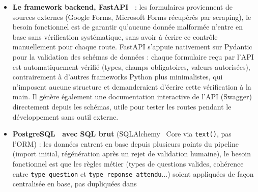 \documentclass[12pt,a4paper]{report}
\begin{document}
\begin{itemize}
    et bien cadrés. Son support multilingue prêt à l'emploi (français et anglais, les deux
    langues des formulaires traités) a aussi pesé dans ce choix. Un premier essai en
    conditions réelles a montré
    qu'une image brute donne souvent un score de confiance insuffisant (image inclinée,
    contraste faible, texte petit) : un pipeline de prétraitement a donc été construit
    (redressement automatique par détection d'angle, égalisation de contraste CLAHE,
    isolement du texte clair/sombre selon le fond, agrandissement x4 pour le texte fin),
    dont les variantes les plus coûteuses (agrandissement, tests multiples) ne sont
    calculées que si une première passe rapide n'atteint pas un score de confiance
    suffisant, ce qui évite de payer ce coût de calcul sur les images déjà bien reconnues dès le
    premier essai. Le score de confiance final conditionne aussi le
    \texttt{statut\_extraction} de la question (\texttt{ocr\_incertain} en dessous d'un
    seuil), pour qu'une extraction douteuse soit signalée à la validation humaine plutôt
    que silencieusement acceptée.
    \item \textbf{Le framework backend, FastAPI~\cite{fastapi}} : les formulaires
    proviennent de sources externes (Google Forms, Microsoft Forms
    récupérés par scraping), le besoin fonctionnel est de garantir
    qu'aucune donnée malformée n'entre en base sans vérification
    systématique, sans avoir à écrire ce contrôle manuellement pour
    chaque route. FastAPI s'appuie nativement sur Pydantic~\cite{pydantic} pour la
    validation des schémas de données : chaque formulaire reçu par l'API
    est automatiquement vérifié (types, champs obligatoires, valeurs
    autorisées), contrairement à d'autres frameworks Python plus
    minimalistes, qui n'imposent aucune structure et demanderaient
    d'écrire cette vérification à la main. Il génère également une
    documentation interactive de l'API (Swagger) directement depuis les
    schémas, utile pour tester les routes pendant le développement sans
    outil externe.
    \item \textbf{PostgreSQL~\cite{postgresql} avec SQL brut} (SQLAlchemy~\cite{sqlalchemy} Core via
    \texttt{text()}, pas l'ORM) : les données entrent en base depuis
    plusieurs points du pipeline (import initial, régénération après un
    rejet de validation humaine), le besoin fonctionnel est que les
    règles métier (types de questions valides, cohérence entre
    \texttt{type\_question} et \texttt{type\_reponse\_attendu}...)
    soient appliquées de façon centralisée en base, pas dupliquées dans

\end{itemize}
\end{document}

